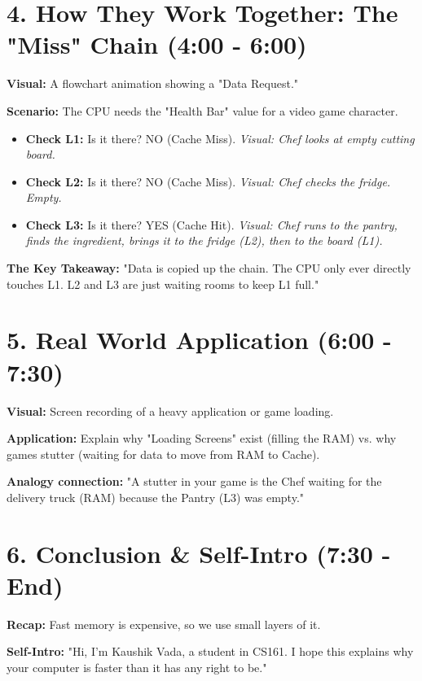 \documentclass{article}
\begin{document}
\section*{4. How They Work Together: The "Miss" Chain (4:00 - 6:00)}
\textbf{Visual:} A flowchart animation showing a "Data Request."

\textbf{Scenario:} The CPU needs the "Health Bar" value for a video game character.

\begin{itemize}
    \item \textbf{Check L1:} Is it there? NO (Cache Miss). \textit{Visual: Chef looks at empty cutting board.}
    \item \textbf{Check L2:} Is it there? NO (Cache Miss). \textit{Visual: Chef checks the fridge. Empty.}
    \item \textbf{Check L3:} Is it there? YES (Cache Hit). \textit{Visual: Chef runs to the pantry, finds the ingredient, brings it to the fridge (L2), then to the board (L1).}
\end{itemize}

\textbf{The Key Takeaway:} "Data is copied up the chain. The CPU only ever directly touches L1. L2 and L3 are just waiting rooms to keep L1 full."

\section*{5. Real World Application (6:00 - 7:30)}
\textbf{Visual:} Screen recording of a heavy application or game loading.

\textbf{Application:} Explain why "Loading Screens" exist (filling the RAM) vs. why games stutter (waiting for data to move from RAM to Cache).

\textbf{Analogy connection:} "A stutter in your game is the Chef waiting for the delivery truck (RAM) because the Pantry (L3) was empty."

\section*{6. Conclusion \& Self-Intro (7:30 - End)}
\textbf{Recap:} Fast memory is expensive, so we use small layers of it.

\textbf{Self-Intro:} "Hi, I'm Kaushik Vada, a student in CS161. I hope this explains why your computer is faster than it has any right to be."
\end{document}
